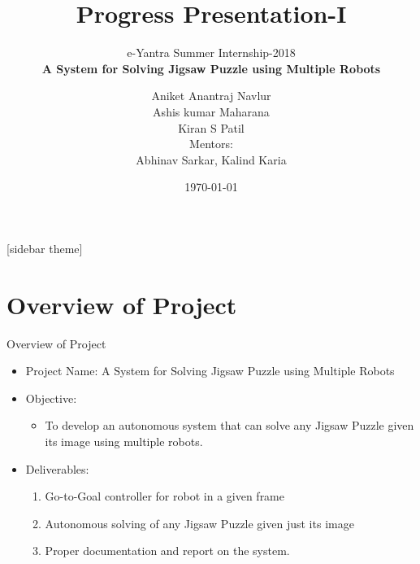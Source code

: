\documentclass[10pt,a4paper]{beamer}
\begin{document}
	\title{Progress Presentation-I}
	\subtitle{e-Yantra Summer Internship-2018 \\ $ $\textbf{A System for Solving Jigsaw Puzzle using Multiple Robots}$ $}
	\author{$ $Aniket Anantraj Navlur$ $\\$ $Ashis kumar Maharana$ $\\$ $Kiran S Patil$ $\\ \vspace{1em}
	Mentors: \\$ $Abhinav Sarkar, Kalind Karia$ $}
	\date{\today}
	\frame{\titlepage}

[sidebar theme]
\section{Overview of Project}
\begin{frame}{Overview of Project}
	
	\begin{itemize}
		\item Project Name: A System for Solving Jigsaw Puzzle using Multiple Robots
		\item Objective:
		\begin{itemize}
			\item To develop an autonomous system that can solve any Jigsaw Puzzle given its image using multiple robots. 
		\end{itemize}
		\item Deliverables:
		\begin{enumerate}
			\item Go-to-Goal controller for robot in a given frame
			\item Autonomous solving of any Jigsaw Puzzle given just its image
			\item Proper documentation and report on the system.
		\end{enumerate}
	\end{itemize}
\end{frame}
\end{document}
